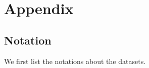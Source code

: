 \documentclass{article}
\begin{document}

\newpage
\begin{small}
    
\end{small}

\appendix


\section{Appendix}

\subsection{Notation}
\label{appendix-notation}

We first list the notations about the datasets.
\end{document}
